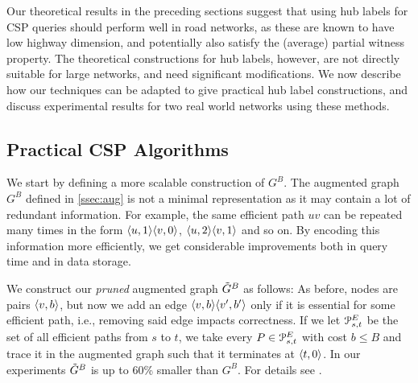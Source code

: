 Our theoretical results in the preceding sections suggest that using hub labels for CSP queries should perform well in road networks, as these are known to have low highway dimension, and potentially also satisfy the (average) partial witness property. The theoretical constructions for hub labels, however, are not directly suitable for large networks, and need significant modifications. We now describe how our techniques can be adapted to give practical hub label constructions, and discuss experimental results for two real world networks using these methods. 

\subsection{Practical CSP Algorithms} 
\label{ssec:practical}

We start by defining a more scalable construction of $G^B$.
The augmented graph $G^B$ defined in \cref{ssec:aug} is not a minimal representation as it may contain a lot of redundant information.
For example, the same efficient path $uv$ can be repeated many times in the form $\langle u,1\rangle\langle v,0\rangle$, $\langle u,2\rangle\langle v,1\rangle$ and so on.
By encoding this information more efficiently, we get considerable improvements both in query time and in data storage.

We construct our \emph{pruned} augmented graph $\tilde G^B$ as follows:
As before, nodes are pairs $\langle v,b\rangle$, but now we add an edge $\langle v,b\rangle\langle v',b'\rangle$ only if it is essential for some efficient path, i.e., removing said edge impacts correctness.
If we let $\mathcal{P}_{s,t}^E$ be the set of all efficient paths from $s$ to $t$, we take every $P\in \mathcal{P}_{s,t}^E$ with cost $b\leq B$ and trace it in the augmented graph such that it terminates at $\langle t,0\rangle$.
%
In our experiments $\tilde G^B$ is up to 60\% smaller than $G^B$.
For details see \cite{TechReport}.

